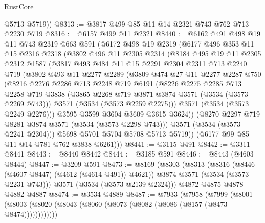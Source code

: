 \begin{lexlean}{RustCore}
\begin{coremodule}
        @5713
        @5719))
@8313 := @3817 @499 @85 @11 @14 @2321 @743 @762 @713 @2230 @719
@8316 := @6157 @499 @11 @2321
@8440 := @6162
    @491
    @498
    @19
    @11
    @743
    @2319
    @663
    @591
    (@6172
      @498
      @19
      @2319
      (@6177
        @496
        @353
        @11
        @15
        @2316
        @2318
        (@3802
          @496
          @11
          @2305
          @2314
          (@8184
            @495
            @19
            @11
            @2305
            @2312
            @1587
            (@3817
              @493
              @484
              @11
              @15
              @2291
              @2304
              @2311
              @713
              @2240
              @719
              (@3802
                @493
                @11
                @2277
                @2289
                (@3809
                  @474
                  @27
                  @11
                  @2277
                  @2287
                  @750
                  (@8216
                    @2276
                    @2286
                    @713
                    @2248
                    @719
                    @6191
                    (@8226
                      @2275
                      @2285
                      @713
                      @2258
                      @719
                      @3838
                      (@3865 @2268 @719 @3871 @3874 @3571 (@3534 (@3573 @2269 @743)))
                      @3571
                      (@3534 (@3573 @2259 @2275)))
                    @3571
                    (@3534 (@3573 @2249 @2276)))
                  @3595
                  @3599
                  @3604
                  @3609
                  @3615
                  @3624))
              (@8270 @2297 @719 @8281 @3874 @3571 (@3534 (@3573 @2298 @743)))
              @3571
              (@3534 (@3573 @2241 @2304)))
            @5698
            @5701
            @5704
            @5708
            @5713
            @5719))
        (@6177 @99 @85 @11 @14 @781 @762 @3838 @6261)))
@8441 := @3115 @491
@8442 := @3311 @8441
@8443 := @8440 @8442
@8444 := @3185 @591
@8446 := @8443 (@4603 @8444)
@8447 := @3209 @591
@8473 := @8169
    (@8303
      (@8313
        (@8316 (@8446 (@4607 @8447) (@4612 (@4614 @491)) @4621))
        @3874
        @3571
        (@3534 (@3573 @2231 @743)))
      @3571
      (@3534 (@3573 @2139 @2324)))
    @4872
    @4875
    @4878
    @4882
    @4887
@8474 := @3534 @4889
@8487 := @7933
    (@7958
      (@7999 (@8001 (@8003 (@8020 (@8043 (@8060 (@8073 (@8082 (@8086 (@8157 (@8473 @8474))))))))))))

\end{coremodule}
\end{lexlean}
